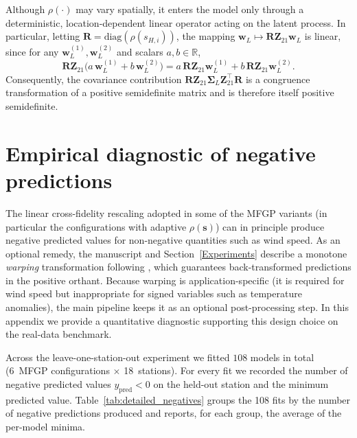 \documentclass[12pt]{article}
\begin{document}
Although $\rho(\cdot)$ may vary spatially, it enters the model only through
a deterministic, location-dependent linear operator acting on the latent
process. In particular, letting $\bm{R}=\mathrm{diag}(\rho(s_{H,i}))$,
the mapping $\bm{w}_L \mapsto \bm{R}\bm{Z}_{21}\bm{w}_L$ is linear,
since for any $\bm{w}_L^{(1)},\bm{w}_L^{(2)}$ and scalars $a,b\in\mathbb{R}$,
\[
\bm{R}\bm{Z}_{21}\bigl(a\,\bm{w}_L^{(1)} + b\,\bm{w}_L^{(2)}\bigr)
=
a\,\bm{R}\bm{Z}_{21}\bm{w}_L^{(1)}
+
b\,\bm{R}\bm{Z}_{21}\bm{w}_L^{(2)}.
\]
Consequently, the covariance contribution
$\bm{R}\bm{Z}_{21}\boldsymbol{\Sigma}_L\bm{Z}_{21}^\top\bm{R}$
is a congruence transformation of a positive semidefinite matrix and is
therefore itself positive semidefinite.













\section{Empirical diagnostic of negative predictions}\label{app:negatives}

The linear cross-fidelity rescaling adopted in some of the MFGP variants (in particular the configurations with adaptive $\rho(\bm{s})$) can in principle produce negative predicted values for non-negative quantities such as wind speed. As an optional remedy, the manuscript and Section~\ref{Experiments} describe a monotone \emph{warping} transformation following \citet{colombo2025warped}, which guarantees back-transformed predictions in the positive orthant. Because warping is application-specific (it is required for wind speed but inappropriate for signed variables such as temperature anomalies), the main pipeline keeps it as an optional post-processing step. In this appendix we provide a quantitative diagnostic supporting this design choice on the real-data benchmark.

Across the leave-one-station-out experiment we fitted $108$ models in total (6~MFGP configurations $\times$ 18~stations). For every fit we recorded the number of negative predicted values $y_{\text{pred}}<0$ on the held-out station and the minimum predicted value. Table~\ref{tab:detailed_negatives} groups the 108 fits by the number of negative predictions produced and reports, for each group, the average of the per-model minima.
\end{document}
